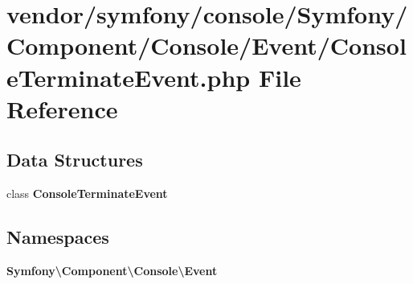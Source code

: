 \section{vendor/symfony/console/\+Symfony/\+Component/\+Console/\+Event/\+Console\+Terminate\+Event.php File Reference}
\label{_console_terminate_event_8php}
\subsection*{Data Structures}
\begin{DoxyCompactItemize}
\item 
class {\bf Console\+Terminate\+Event}
\end{DoxyCompactItemize}
\subsection*{Namespaces}
\begin{DoxyCompactItemize}
\item 
 {\bf Symfony\textbackslash{}\+Component\textbackslash{}\+Console\textbackslash{}\+Event}
\end{DoxyCompactItemize}
